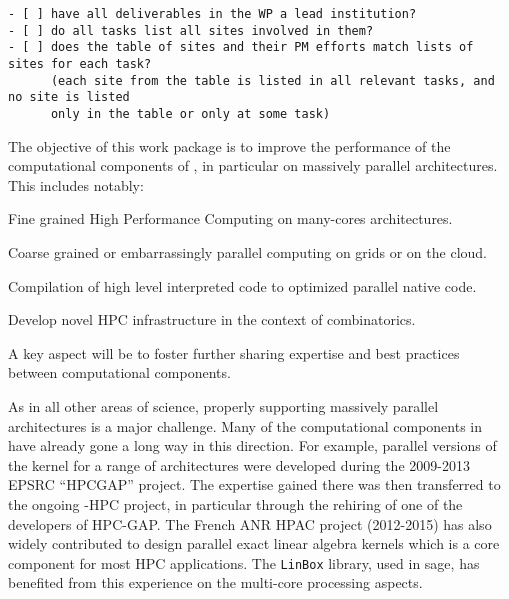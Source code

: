 \begin{draft}
\begin{verbatim}
- [ ] have all deliverables in the WP a lead institution?
- [ ] do all tasks list all sites involved in them? 
- [ ] does the table of sites and their PM efforts match lists of sites for each task?
      (each site from the table is listed in all relevant tasks, and no site is listed
      only in the table or only at some task)
\end{verbatim}
\end{draft}



\begin{workpackage}[id=hpc,wphases=0-48,
  title=High Performance Mathematical Computing,
  lead=UJF,
  PSRM=6,   %
  LLRM=12,  %
  SARM=18,  %
  UKRM=1,   %
  UBRM=34,  %
  UJFRM=52] %
  

\begin{wpobjectives}
  The objective of this work package is to improve the performance of
  the computational components of \TheProject, in particular on
  massively parallel architectures. This includes notably:
  \begin{compactitem}
  \item Fine grained High Performance Computing on many-cores architectures.
  \item Coarse grained or embarrassingly parallel computing on grids or on the cloud.
  \item Compilation of high level interpreted code to optimized parallel native code.
  \item Develop novel HPC infrastructure in the context of combinatorics.
  \end{compactitem}
  A key aspect will be to foster further sharing expertise and best
  practices between computational components.
\end{wpobjectives}

\begin{wpdescription}
  As in all other areas of science, properly supporting massively
  parallel architectures is a major challenge. Many of the
  computational components in \TheProject have already gone a long way
  in this direction. For example, parallel versions
  of the \GAP kernel for
  a range of architectures were developed during the 2009-2013 EPSRC
  ``HPCGAP'' project. The expertise
  gained there was then transferred to the ongoing \Singular-HPC
  project, in particular through the rehiring of one of the developers
  of HPC-GAP. The French ANR HPAC project (2012-2015) has also widely contributed to design
  parallel exact linear algebra kernels  which is a core component for most HPC
  applications. The \texttt{LinBox} library, used in sage, has benefited from this
  experience on the multi-core processing aspects. 


\end{wpdescription}
\end{workpackage}
